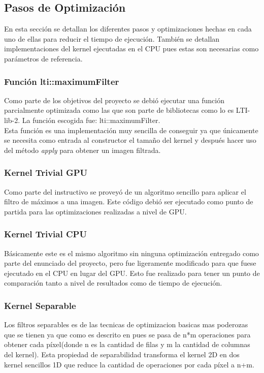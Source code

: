 \documentclass[conference]{IEEEtran}
\begin{document}
\subsection{\textbf{Pasos de Optimización}}
En esta sección se detallan los diferentes pasos y optimizaciones hechas en cada uno de ellas para reducir el tiempo de ejecución. También se detallan implementaciones del kernel ejecutadas en el CPU pues estas son necesarias como parámetros de referencia.
\subsubsection{\textbf{Función lti::maximumFilter}}
Como parte de los objetivos del proyecto se debió ejecutar una función parcialmente optimizada como las que son parte de bibliotecas como lo es LTI-lib-2. La función escogida fue: lti::maximumFilter.\\
Esta función es una implementación muy sencilla de conseguir ya que únicamente se necesita como entrada al constructor el tamaño del kernel y después hacer uso del método \textit{apply} para obtener un imagen filtrada\cite{lti_max}.
\subsubsection{\textbf{Kernel Trivial GPU}}
Como parte del instructivo se proveyó de un algoritmo sencillo para aplicar el filtro de máximos a una imagen. Este código debió ser ejecutado como punto de partida para las optimizaciones realizadas a nivel de GPU.
\subsubsection{\textbf{Kernel Trivial CPU}}
Básicamente este es el mismo algoritmo sin ninguna optimización entregado como parte del enunciado del proyecto, pero fue ligeramente modificado para que fuese ejecutado en el CPU en lugar del GPU. Esto fue realizado para tener un punto de comparación tanto a nivel de resultados como de tiempo de ejecución.
\subsubsection{\textbf{Kernel Separable}}
Los filtros separables es de las tecnicas de optimizacion basicas mas poderozas que se tienen ya que como es descrito en \cite{victor_cuda}\cite{separable_pablo} pues se pasa de n*m operaciones para obtener cada píxel(donde n es la cantidad de filas y m la cantidad de columnas del kernel). Esta propiedad de separabilidad transforma el kernel 2D en dos kernel sencillos 1D que reduce la cantidad de operaciones por cada píxel a n+m.
\end{document}

